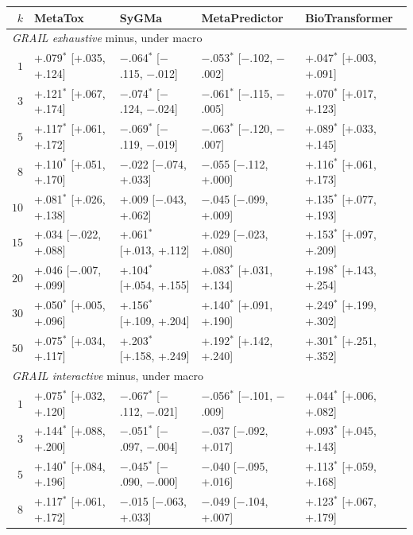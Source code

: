 \begin{table}[h]
\begin{threeparttable}
\begin{tabular}{rllll}
\toprule
$k$ & MetaTox & SyGMa & MetaPredictor & BioTransformer \\
\midrule
\multicolumn{5}{l}{\emph{GRAIL exhaustive} minus, under macro} \\
$1$ & +.079$^{*}$ [+.035, +.124] & $-$.064$^{*}$ [$-$.115, $-$.012] & $-$.053$^{*}$ [$-$.102, $-$.002] & +.047$^{*}$ [+.003, +.091] \\
$3$ & +.121$^{*}$ [+.067, +.174] & $-$.074$^{*}$ [$-$.124, $-$.024] & $-$.061$^{*}$ [$-$.115, $-$.005] & +.070$^{*}$ [+.017, +.123] \\
$5$ & +.117$^{*}$ [+.061, +.172] & $-$.069$^{*}$ [$-$.119, $-$.019] & $-$.063$^{*}$ [$-$.120, $-$.007] & +.089$^{*}$ [+.033, +.145] \\
$8$ & +.110$^{*}$ [+.051, +.170] & $-$.022\phantom{$^{*}$} [$-$.074, +.033] & $-$.055\phantom{$^{*}$} [$-$.112, +.000] & +.116$^{*}$ [+.061, +.173] \\
$10$ & +.081$^{*}$ [+.026, +.138] & +.009\phantom{$^{*}$} [$-$.043, +.062] & $-$.045\phantom{$^{*}$} [$-$.099, +.009] & +.135$^{*}$ [+.077, +.193] \\
$15$ & +.034\phantom{$^{*}$} [$-$.022, +.088] & +.061$^{*}$ [+.013, +.112] & +.029\phantom{$^{*}$} [$-$.023, +.080] & +.153$^{*}$ [+.097, +.209] \\
$20$ & +.046\phantom{$^{*}$} [$-$.007, +.099] & +.104$^{*}$ [+.054, +.155] & +.083$^{*}$ [+.031, +.134] & +.198$^{*}$ [+.143, +.254] \\
$30$ & +.050$^{*}$ [+.005, +.096] & +.156$^{*}$ [+.109, +.204] & +.140$^{*}$ [+.091, +.190] & +.249$^{*}$ [+.199, +.302] \\
$50$ & +.075$^{*}$ [+.034, +.117] & +.203$^{*}$ [+.158, +.249] & +.192$^{*}$ [+.142, +.240] & +.301$^{*}$ [+.251, +.352] \\
\midrule
\multicolumn{5}{l}{\emph{GRAIL interactive} minus, under macro} \\
$1$ & +.075$^{*}$ [+.032, +.120] & $-$.067$^{*}$ [$-$.112, $-$.021] & $-$.056$^{*}$ [$-$.101, $-$.009] & +.044$^{*}$ [+.006, +.082] \\
$3$ & +.144$^{*}$ [+.088, +.200] & $-$.051$^{*}$ [$-$.097, $-$.004] & $-$.037\phantom{$^{*}$} [$-$.092, +.017] & +.093$^{*}$ [+.045, +.143] \\
$5$ & +.140$^{*}$ [+.084, +.196] & $-$.045$^{*}$ [$-$.090, $-$.000] & $-$.040\phantom{$^{*}$} [$-$.095, +.016] & +.113$^{*}$ [+.059, +.168] \\
$8$ & +.117$^{*}$ [+.061, +.172] & $-$.015\phantom{$^{*}$} [$-$.063, +.033] & $-$.049\phantom{$^{*}$} [$-$.104, +.007] & +.123$^{*}$ [+.067, +.179] \\

\end{tabular}
\end{threeparttable}
\end{table}
